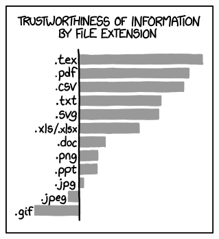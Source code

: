 \documentclass[intlimits,twoside,a4paper,11pt]{article}
\begin{document}
    \begin{figure}[H]
        \centering
        \begin{subfigure}[t]{70mm} %
            \includegraphics[width=\textwidth]{xkcd1301.png} %
            \label{fig-example-2a}
        \end{subfigure}
        \quad %
        \begin{subfigure}[t]{50mm}

\end{subfigure}
\end{figure}
\end{document}
